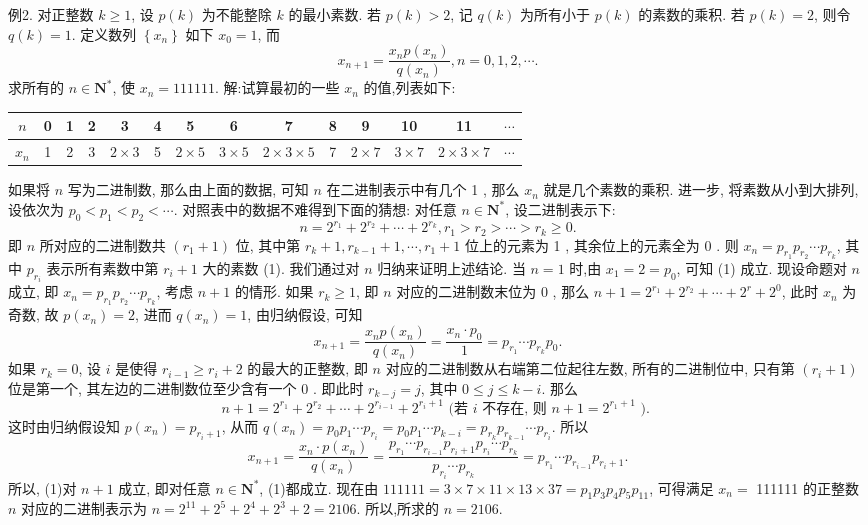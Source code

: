 例2. 对正整数 $k \geqslant 1$, 设 $p(k)$ 为不能整除 $k$ 的最小素数.
若 $p(k)>2$, 记 $q(k)$ 为所有小于 $p(k)$ 的素数的乘积.
若 $p(k)=2$, 则令 $q(k)=1$.
定义数列 $\left\{x_n\right\}$ 如下 $x_0=1$, 而
$$
x_{n+1}=\frac{x_n p\left(x_n\right)}{q\left(x_n\right)}, n=0,1,2, \cdots .
$$
求所有的 $n \in \mathbf{N}^*$, 使 $x_n=111111$.
解:试算最初的一些 $x_n$ 的值,列表如下:
\begin{tabular}{|c|c|c|c|c|c|c|c|c|c|c|c|c|c|}
\hline$n$ & 0 & 1 & 2 & 3 & 4 & 5 & 6 & 7 & 8 & 9 & 10 & 11 & $\cdots$ \\
\hline$x_n$ & 1 & 2 & 3 & $2 \times 3$ & 5 & $2 \times 5$ & $3 \times 5$ & $2 \times 3 \times 5$ & 7 & $2 \times 7$ & $3 \times 7$ & $2 \times 3 \times 7$ & $\cdots$ \\
\hline
\end{tabular}
如果将 $n$ 写为二进制数, 那么由上面的数据, 可知 $n$ 在二进制表示中有几个 1 , 那么 $x_n$ 就是几个素数的乘积.
进一步, 将素数从小到大排列, 设依次为 $p_0<p_1<p_2<\cdots$. 对照表中的数据不难得到下面的猜想:
对任意 $n \in \mathbf{N}^*$, 设二进制表示下:
$$
n=2^{r_1}+2^{r_2}+\cdots+2^{r_k}, r_1>r_2>\cdots>r_k \geqslant 0 .
$$
即 $n$ 所对应的二进制数共 $\left(r_1+1\right)$ 位, 其中第 $r_k+1, r_{k-1}+1, \cdots, r_1+1$ 位上的元素为 1 , 其余位上的元素全为 0 . 则 $x_n=p_{r_1} p_{r_2} \cdots p_{r_k}$, 其中 $p_{r_i}$ 表示所有素数中第 $r_i+1$ 大的素数 (1).
我们通过对 $n$ 归纳来证明上述结论.
当 $n=1$ 时,由 $x_1=2=p_0$, 可知 (1) 成立.
现设命题对 $n$ 成立, 即 $x_n=p_{r_1} p_{r_2} \cdots p_{r_k}$, 考虑 $n+1$ 的情形.
如果 $r_k \geqslant 1$, 即 $n$ 对应的二进制数末位为 0 , 那么 $n+1=2^{r_1}+2^{r_2}+\cdots+ 2^r+2^0$, 此时 $x_n$ 为奇数, 故 $p\left(x_n\right)=2$, 进而 $q\left(x_n\right)=1$, 由归纳假设, 可知
$$
x_{n+1}=\frac{x_n p\left(x_n\right)}{q\left(x_n\right)}=\frac{x_n \cdot p_0}{1}=p_{r_1} \cdots p_{r_k} p_0 .
$$
如果 $r_k=0$, 设 $i$ 是使得 $r_{i-1} \geqslant r_i+2$ 的最大的正整数, 即 $n$ 对应的二进制数从右端第二位起往左数, 所有的二进制位中, 只有第 $\left(r_i+1\right)$ 位是第一个, 其左边的二进制数位至少含有一个 0 . 即此时 $r_{k-j}=j$, 其中 $0 \leqslant j \leqslant k-i$. 那么
$$
n+1=2^{r_1}+2^{r_2}+\cdots+2^{r_{i-1}}+2^{r_i+1} \text { (若 } i \text { 不存在, 则 } n+1=2^{r_1+1} \text { ). }
$$
这时由归纳假设知 $p\left(x_n\right)=p_{r_i+1}$, 从而 $q\left(x_n\right)=p_0 p_1 \cdots p_{r_i}=p_0 p_1 \cdots p_{k-i}= p_{r_k} p_{r_{k-1}} \cdots p_{r_i}$. 所以
$$
x_{n+1}=\frac{x_n \cdot p\left(x_n\right)}{q\left(x_n\right)}=\frac{p_{r_1} \cdots p_{r_{i-1}} p_{r_i+1} p_{r_i} \cdots p_{r_k}}{p_{r_i} \cdots p_{r_k}}=p_{r_1} \cdots p_{r_{i-1}} p_{r_i+1} .
$$
所以, (1)对 $n+1$ 成立, 即对任意 $n \in \mathbf{N}^*$, (1)都成立.
现在由 $111111=3 \times 7 \times 11 \times 13 \times 37=p_1 p_3 p_4 p_5 p_{11}$, 可得满足 $x_n=$ 111111 的正整数 $n$ 对应的二进制表示为 $n=2^{11}+2^5+2^4+2^3+2=2106$. 所以,所求的 $n=2106$.




